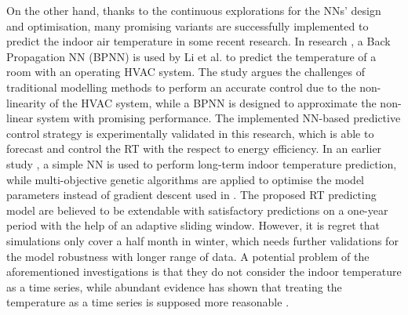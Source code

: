 \documentclass[11pt]{article}
\begin{document}
On the other hand, thanks to the continuous explorations for the NNs’ design and optimisation, many promising variants are successfully implemented to predict the indoor air temperature in some recent research. In research \citep{li2013hvac}, a Back Propagation NN (BPNN) is used by Li et al. to predict the temperature of a room with an operating HVAC system. The study argues the challenges of traditional modelling methods to perform an accurate control due to the non-linearity of the HVAC system, while a BPNN is designed to approximate the non-linear system with promising performance. The implemented NN-based predictive control strategy is experimentally validated in this research, which is able to forecast and control the RT with the respect to energy efficiency. In an earlier study \citep{ruano2006prediction}, a simple NN is used to perform long-term indoor temperature prediction, while  multi-objective genetic algorithms are applied to optimise the model parameters instead of gradient descent used in \citep{li2013hvac}. The proposed RT predicting model are believed to be extendable with satisfactory predictions on a one-year period with the help of an adaptive sliding window. However, it is regret that simulations only cover a half month in winter, which needs further validations for the model robustness with longer range of data. A potential problem of the aforementioned investigations is that they do not consider the indoor temperature as a time series, while abundant evidence has shown that treating the temperature as a time series is supposed more reasonable \citep{mateo2013machine} \citep{godahewa2020simulation} \citep{xu2019improving}.
\end{document}
